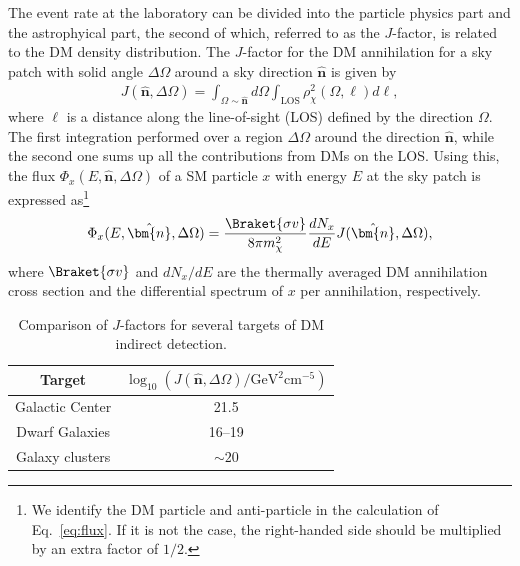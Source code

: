 \documentclass[12pt,twoside,book]{article}
\begin{document}
The event rate at the laboratory can be divided into the particle physics part and the astrophyical part, the second of which, referred to as the $J$-factor, is related to the DM density distribution.
The $J$-factor for the DM annihilation for a sky patch with solid angle $\Delta\Omega$ around a sky direction $\hat{\bm{n}}$ is given by
\begin{align}
  J(\hat{\bm{n}}, \Delta\Omega) = \int_{\Omega \sim \hat{\bm{n}}} d\Omega
  \int_{\mathrm{LOS}} \rho_\chi^2 (\Omega, \ell) d\ell,
  \label{eq:J-factor}
\end{align}
where $\ell$ is a distance along the line-of-sight (LOS) defined by the direction $\Omega$.
The first integration performed over a region $\Delta\Omega$ around the direction $\hat{\bm{n}}$, while the second one sums up all the contributions from DMs on the LOS.
Using this, the flux $\Phi_x(E, \hat{\bm{n}}, \Delta\Omega)$ of a SM particle $x$ with energy $E$ at the sky patch is expressed as\footnote{
  We identify the DM particle and anti-particle in the calculation of Eq.~\eqref{eq:flux}.
  If it is not the case, the right-handed side should be multiplied by an extra factor of $1/2$.
}
\begin{align}
  \Phi_x (E, \hat{\bm{n}}, \Delta\Omega) = \frac{\Braket{\sigma v}}{8\pi m_\chi^2}
  \frac{d N_x}{d E} J(\hat{\bm{n}}, \Delta\Omega),
  \label{eq:flux}
\end{align}
where $\Braket{\sigma v}$ and $d N_x / d E$ are the thermally averaged DM annihilation cross section and the differential spectrum of $x$ per annihilation, respectively.

\begin{table}[t]
  \centering
  \begin{tabular}{c|c}
    Target & $\log_{10} (J(\hat{\bm{n}}, \Delta\Omega) / \mathrm{GeV}^2 \mathrm{cm}^{-5})$ \\ \hline
    Galactic Center & 21.5\\
    Dwarf Galaxies & 16--19\\
    Galaxy clusters & $\sim 20$
  \end{tabular}
  \caption{Comparison of $J$-factors for several targets of DM indirect detection.}
  \label{tab:J-factors}
\end{table}
\end{document}
